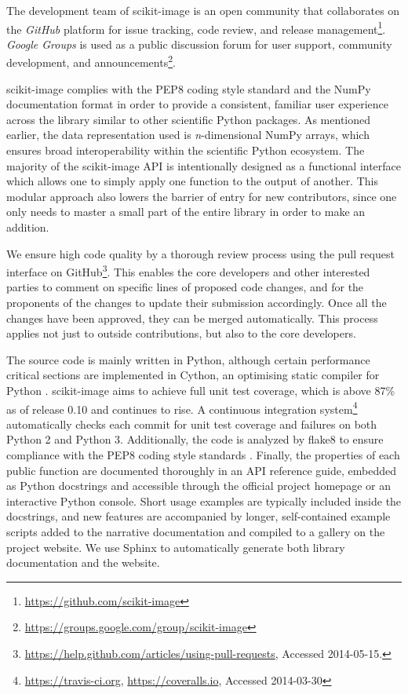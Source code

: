 \documentclass[fleqn,12pt]{wlpeerj}
\begin{document}
The development team of scikit-image is an open community that collaborates on the \emph{GitHub} platform for issue tracking, code review, and release management\footnote{\url{https://github.com/scikit-image}}. \emph{Google Groups} is used as a public discussion forum for user support, community development, and announcements\footnote{\url{https://groups.google.com/group/scikit-image}}.

scikit-image complies with the PEP8 coding style standard \citep{PEP8} and the NumPy documentation format \citep{NumpyDoc} in order to provide a consistent, familiar user experience across the library similar to other scientific Python packages. As mentioned earlier, the data representation used is \emph{n}-dimensional NumPy arrays, which ensures broad interoperability within the scientific Python ecosystem. The majority of the scikit-image API is intentionally designed as a functional interface which allows one to simply apply one function to the output of another. This modular approach also lowers the barrier of entry for new contributors, since one only needs to master a small part of the entire library in order to make an addition.

We ensure high code quality by a thorough review process using the pull
request interface on GitHub\footnote{\url{https://help.github.com/articles/using-pull-requests}, Accessed 2014-05-15.}.
This enables the core developers and other interested parties to comment on
specific lines of proposed code changes, and for the proponents of the
changes to update their submission accordingly. Once all the changes have
been approved, they can be merged automatically. This process applies not
just to outside contributions, but also to the core developers.

The source code is mainly written in Python, although certain performance critical sections are implemented in Cython, an optimising static compiler for Python \citep{Cython}. scikit-image aims to achieve full unit test coverage, which is above 87\% as of release 0.10 and continues to rise. A continuous integration system\footnote{\url{https://travis-ci.org}, \url{https://coveralls.io}, Accessed 2014-03-30} automatically checks each commit for unit test coverage and failures on both Python 2 and Python 3. Additionally, the code is analyzed by flake8 \citep{flake8} to ensure compliance with the PEP8 coding style standards \citep{PEP8}. Finally, the properties of each public function are documented thoroughly in an API reference guide, embedded as Python docstrings and accessible through the official project homepage or an interactive Python console. Short usage examples are typically included inside the docstrings, and new features are accompanied by longer, self-contained example scripts added to the narrative documentation and compiled to a gallery on the project website. We use Sphinx \citep{Sphinx} to automatically generate both library documentation and the website.
\end{document}
